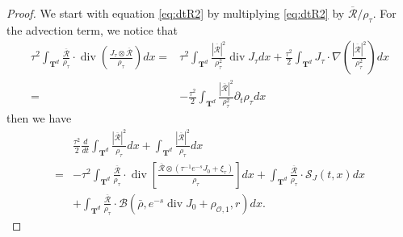 \documentclass[10pt,a4paper]{amsart}
\def\T{{\mathbf T}}%
\def\d{{\partial}}
\DeclareMathOperator{\diver}{div}
\begin{document}
\begin{proof}

We start with equation \eqref{eq:dtR2} by multiplying \eqref{eq:dtR2} by $\overline{\mathcal{R}}/\rho_\tau$. For the advection term, we notice that
\begin{align*}
\tau^2\int_{\T^d} \frac{\overline{\mathcal{R}}}{\rho_\tau}\cdot\diver\left(\frac{J_\tau\otimes\overline{\mathcal{R}}}{\rho_\tau}\right)dx=&\tau^2\int_{\T^d} \frac{|\overline{\mathcal{R}}|^2}{\rho_\tau^2}\diver J_\tau dx+\frac{\tau^2}{2}\int_{\T^d} J_\tau\cdot\nabla\left(\frac{|\overline{\mathcal{R}}|^2}{\rho_\tau^2}\right)dx\\
=&-\frac{\tau^2}{2}\int_{\T^d} \frac{|\overline{\mathcal{R}}|^2}{\rho_\tau^2}\d_t\rho_\tau dx
\end{align*}
then we have
\begin{align*}
&\frac{\tau^2}{2}\frac{d}{dt}\int_{\T^d} \frac{|\overline{\mathcal{R}}|^2}{\rho_\tau}dx+\int_{\T^d} \frac{|\overline{\mathcal{R}}|^2}{\rho_\tau}dx\\
=&-\tau^2\int_{\T^d} \frac{\overline{\mathcal{R}}}{\rho_\tau}\cdot\diver\left[\frac{\overline{\mathcal{R}}\otimes(\tau^{-1}e^{-s}J_0+\xi_\tau)}{\rho_\tau}\right]dx+\int_{\T^d} \frac{\overline{\mathcal{R}}}{\rho_\tau}\cdot\mathcal{S}_J(t,x)dx\\
&+\int_{\T^d} \frac{\overline{\mathcal{R}}}{\rho_\tau}\cdot\mathcal{B}(\bar\rho,e^{-s}\diver J_0+\rho_{\mathcal{O},1},r)dx.
\end{align*}



\end{proof}
\end{document}
